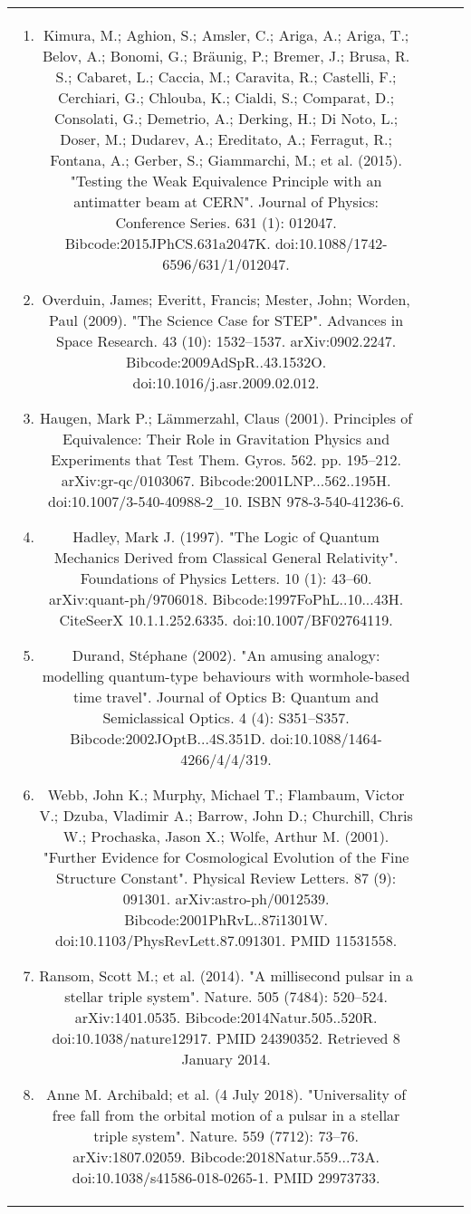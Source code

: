 \begin{table}[ht]
\begin{tabular}{|c|c|c|c}
\begin{enumerate}
\item Kimura, M.; Aghion, S.; Amsler, C.; Ariga, A.; Ariga, T.; Belov, A.; Bonomi, G.; Bräunig, P.; Bremer, J.; Brusa, R. S.; Cabaret, L.; Caccia, M.; Caravita, R.; Castelli, F.; Cerchiari, G.; Chlouba, K.; Cialdi, S.; Comparat, D.; Consolati, G.; Demetrio, A.; Derking, H.; Di Noto, L.; Doser, M.; Dudarev, A.; Ereditato, A.; Ferragut, R.; Fontana, A.; Gerber, S.; Giammarchi, M.; et al. (2015). "Testing the Weak Equivalence Principle with an antimatter beam at CERN". Journal of Physics: Conference Series. 631 (1): 012047. Bibcode:2015JPhCS.631a2047K. doi:10.1088/1742-6596/631/1/012047.
\item Overduin, James; Everitt, Francis; Mester, John; Worden, Paul (2009). "The Science Case for STEP". Advances in Space Research. 43 (10): 1532–1537. arXiv:0902.2247. Bibcode:2009AdSpR..43.1532O. doi:10.1016/j.asr.2009.02.012.
\item Haugen, Mark P.; Lämmerzahl, Claus (2001). Principles of Equivalence: Their Role in Gravitation Physics and Experiments that Test Them. Gyros. 562. pp. 195–212. arXiv:gr-qc/0103067. Bibcode:2001LNP...562..195H. doi:10.1007/3-540-40988-2_10. ISBN 978-3-540-41236-6.
\item Hadley, Mark J. (1997). "The Logic of Quantum Mechanics Derived from Classical General Relativity". Foundations of Physics Letters. 10 (1): 43–60. arXiv:quant-ph/9706018. Bibcode:1997FoPhL..10...43H. CiteSeerX 10.1.1.252.6335. doi:10.1007/BF02764119.
\item Durand, Stéphane (2002). "An amusing analogy: modelling quantum-type behaviours with wormhole-based time travel". Journal of Optics B: Quantum and Semiclassical Optics. 4 (4): S351–S357. Bibcode:2002JOptB...4S.351D. doi:10.1088/1464-4266/4/4/319.
\item Webb, John K.; Murphy, Michael T.; Flambaum, Victor V.; Dzuba, Vladimir A.; Barrow, John D.; Churchill, Chris W.; Prochaska, Jason X.; Wolfe, Arthur M. (2001). "Further Evidence for Cosmological Evolution of the Fine Structure Constant". Physical Review Letters. 87 (9): 091301. arXiv:astro-ph/0012539. Bibcode:2001PhRvL..87i1301W. doi:10.1103/PhysRevLett.87.091301. PMID 11531558.
\item Ransom, Scott M.; et al. (2014). "A millisecond pulsar in a stellar triple system". Nature. 505 (7484): 520–524. arXiv:1401.0535. Bibcode:2014Natur.505..520R. doi:10.1038/nature12917. PMID 24390352. Retrieved 8 January 2014.
\item Anne M. Archibald; et al. (4 July 2018). "Universality of free fall from the orbital motion of a pulsar in a stellar triple system". Nature. 559 (7712): 73–76. arXiv:1807.02059. Bibcode:2018Natur.559...73A. doi:10.1038/s41586-018-0265-1. PMID 29973733.

\end{enumerate}
\end{tabular}
\end{table}
